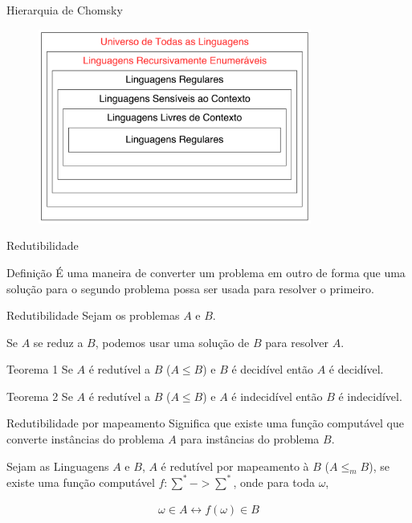 \documentclass{beamer}
\begin{document}
  \begin{frame}{Hierarquia de Chomsky}
    \begin{figure}[ht]
      \includegraphics[width=0.80\textwidth]{img/hierarquia-Chomsky.pdf}
    \end{figure}
  \end{frame}

  \begin{frame}{Redutibilidade}
    \begin{block}{Definição}
      É uma maneira de converter um problema em outro de forma que uma solução para o segundo problema possa ser usada para resolver o primeiro.
    \end{block}
  \end{frame}

  \begin{frame}{Redutibilidade}
    Sejam os problemas $A$ e $B$.\newline

    Se $A$ se reduz a $B$, podemos usar uma solução de $B$ para resolver $A$.\newline

    \begin{block}{Teorema 1}
      Se $A$ é redutível a $B$ ($A \le B$) e $B$ é decidível então $A$ é decidível.
    \end{block}

    \begin{block}{Teorema 2}
      Se $A$ é redutível a $B$ ($A \le B$) e $A$ é indecidível então $B$ é indecidível.
    \end{block}
  \end{frame}

  \begin{frame}{Redutibilidade por mapeamento}
    Significa que existe uma função computável que converte instâncias do problema $A$ para instâncias do problema $B$.\newline

    Sejam as Linguagens $A$ e $B$, $A$ é redutível por mapeamento à $B$ ($A \le_{m} B$), se existe uma função computável $f : \sum^{*} -> \sum^{*}$, onde para toda $\omega$,\newline

    \begin{align*}
      \omega \in A \leftrightarrow f(\omega) \in B
    \end{align*}
  \end{frame}
\end{document}
